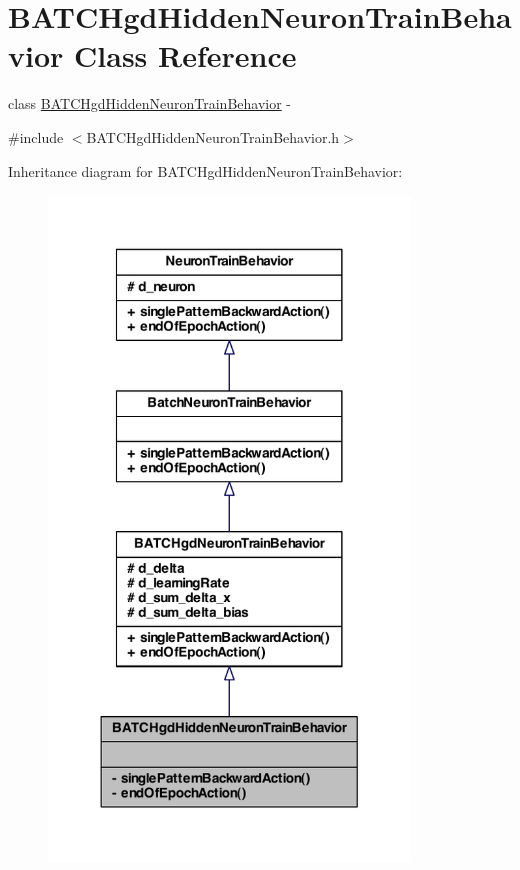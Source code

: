 \hypertarget{class_b_a_t_c_hgd_hidden_neuron_train_behavior}{
\section{BATCHgdHiddenNeuronTrainBehavior Class Reference}
\label{class_b_a_t_c_hgd_hidden_neuron_train_behavior}
}


class \hyperlink{class_b_a_t_c_hgd_hidden_neuron_train_behavior}{BATCHgdHiddenNeuronTrainBehavior} -\/  




{\ttfamily \#include $<$BATCHgdHiddenNeuronTrainBehavior.h$>$}



Inheritance diagram for BATCHgdHiddenNeuronTrainBehavior:
\nopagebreak
\begin{figure}[H]
\begin{center}
\leavevmode
\includegraphics[width=272pt]{class_b_a_t_c_hgd_hidden_neuron_train_behavior__inherit__graph}
\end{center}
\end{figure}


